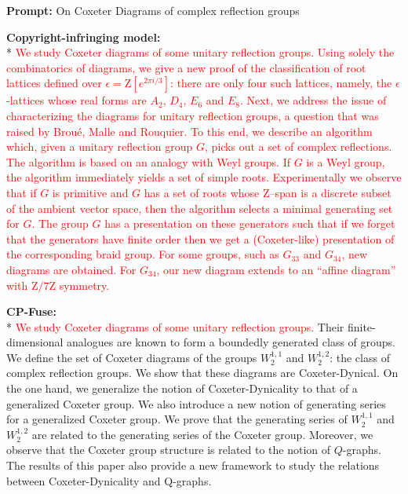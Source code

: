 \begin{breakablefigure}
    \begin{cpfusetextbox}{\textbf{Prompt:} On Coxeter Diagrams of complex reflection groups}
    \footnotesize\raggedright
        \textbf{Copyright-infringing model:}\\*
        \textcolor{red}{We study Coxeter diagrams of some unitary reflection groups. Using solely the combinatorics of diagrams, we give a new proof of the classification of root lattices defined over \(\epsilon = \mathrm{Z}[e^{2 \pi i/3}]\): there are only four such lattices, namely, the \(\epsilon\)-lattices whose real forms are \(A_2\), \(D_4\), \(E_6\) and \(E_8\). Next, we address the issue of characterizing the diagrams for unitary reflection groups, a question that was raised by Brou{\'e}, Malle and Rouquier. To this end, we describe an algorithm which, given a unitary reflection group \(G\), picks out a set of complex reflections. The algorithm is based on an analogy with Weyl groups. If \(G\) is a Weyl group, the algorithm immediately yields a set of simple roots. Experimentally we observe that if \(G\) is primitive and \(G\) has a set of roots whose \(\mathrm{Z}\)--span is a discrete subset of the ambient vector space, then the algorithm selects a minimal generating set for \(G\). The group \(G\) has a presentation on these generators such that if we forget that the generators have finite order then we get a (Coxeter-like) presentation of the corresponding braid group. For some groups, such as \(G_{33}\) and \(G_{34}\), new diagrams are obtained. For \(G_{34}\), our new diagram extends to an ``affine diagram'' with \(\mathrm{Z}/7\mathrm{Z}\) symmetry.}

\vspace{6pt}
        \textbf{CP-Fuse:}\\*
        \textcolor{red}{We study Coxeter diagrams of some unitary reflection groups.} Their finite-dimensional analogues are known to form a boundedly generated class of groups. We define the set of Coxeter diagrams of the groups \(W^{1,1}_{2}\) and \(W^{1,2}_{2}\): the class of complex reflection groups. We show that these diagrams are Coxeter-Dynical. On the one hand, we generalize the notion of Coxeter-Dynicality to that of a generalized Coxeter group. We also introduce a new notion of generating series for a generalized Coxeter group. We prove that the generating series of \(W^{1,1}_{2}\) and \(W^{1,2}_{2}\) are related to the generating series of the Coxeter group. Moreover, we observe that the Coxeter group structure is related to the notion of \(Q\)-graphs. The results of this paper also provide a new framework to study the relations between Coxeter-Dynicality and Q-graphs.


\end{cpfusetextbox}
\end{breakablefigure}
